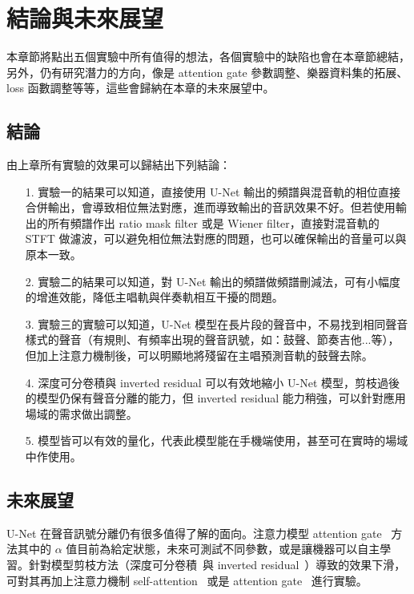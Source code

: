 \chapter{結論與未來展望}

本章節將點出五個實驗中所有值得的想法，各個實驗中的缺陷也會在本章節總結，另外，仍有研究潛力的方向，像是 attention gate 參數調整、樂器資料集的拓展、loss 函數調整等等，這些會歸納在本章的未來展望中。

\section{結論}

由上章所有實驗的效果可以歸結出下列結論：
\begin{itemize}
    \item[1.] 實驗一的結果可以知道，直接使用 U-Net 輸出的頻譜與混音軌的相位直接合併輸出，會導致相位無法對應，進而導致輸出的音訊效果不好。但若使用輸出的所有頻譜作出 ratio mask filter 或是 Wiener filter，直接對混音軌的 STFT 做濾波，可以避免相位無法對應的問題，也可以確保輸出的音量可以與原本一致。
    \item[2.] 實驗二的結果可以知道，對 U-Net 輸出的頻譜做頻譜刪減法，可有小幅度的增進效能，降低主唱軌與伴奏軌相互干擾的問題。
    \item[3.] 實驗三的實驗可以知道，U-Net 模型在長片段的聲音中，不易找到相同聲音樣式的聲音（有規則、有頻率出現的聲音訊號，如：鼓聲、節奏吉他...等），但加上注意力機制後，可以明顯地將殘留在主唱預測音軌的鼓聲去除。
    \item[4.] 深度可分卷積與 inverted residual 可以有效地縮小 U-Net 模型，剪枝過後的模型仍保有聲音分離的能力，但 inverted residual 能力稍強，可以針對應用場域的需求做出調整。
    \item[5.] 模型皆可以有效的量化，代表此模型能在手機端使用，甚至可在實時的場域中作使用。
\end{itemize}


\section{未來展望}

U-Net 在聲音訊號分離仍有很多值得了解的面向。注意力模型 attention gate~\cite{oktay2018attention} 方法其中的 $\alpha$ 值目前為給定狀態，未來可測試不同參數，或是讓機器可以自主學習。針對模型剪枝方法（深度可分卷積~\cite{chollet2017xception,howard2017mobilenets}與 inverted residual~\cite{sandler2018mobilenetv2}）導致的效果下滑，可對其再加上注意力機制 self-attention~\cite{shaw2018self} 或是 attention gate~\cite{oktay2018attention} 進行實驗。

